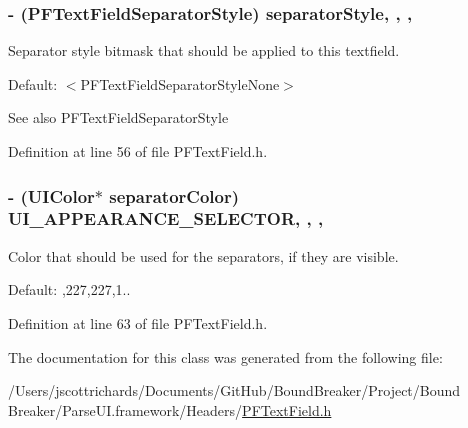 \subsubsection[{separator\+Style}]{\setlength{\rightskip}{0pt plus 5cm}-\/ (P\+F\+Text\+Field\+Separator\+Style) separator\+Style\hspace{0.3cm}{\ttfamily [read]}, {\ttfamily [write]}, {\ttfamily [nonatomic]}, {\ttfamily [assign]}}\label{interface_p_f_text_field_a3ec60a43e08c7bff328c62d7a9038a50}
Separator style bitmask that should be applied to this textfield.

Default\+: $<$\+P\+F\+Text\+Field\+Separator\+Style\+None$>$

\begin{DoxySeeAlso}{See also}
P\+F\+Text\+Field\+Separator\+Style 
\end{DoxySeeAlso}


Definition at line 56 of file P\+F\+Text\+Field.\+h.

\hypertarget{interface_p_f_text_field_a5c0195a8802ca92af06f63762a1093c0}{}
\subsubsection[{U\+I\+\_\+\+A\+P\+P\+E\+A\+R\+A\+N\+C\+E\+\_\+\+S\+E\+L\+E\+C\+T\+O\+R}]{\setlength{\rightskip}{0pt plus 5cm}-\/ (U\+I\+Color$\ast$ separator\+Color) U\+I\+\_\+\+A\+P\+P\+E\+A\+R\+A\+N\+C\+E\+\_\+\+S\+E\+L\+E\+C\+T\+O\+R\hspace{0.3cm}{\ttfamily [read]}, {\ttfamily [write]}, {\ttfamily [nonatomic]}, {\ttfamily [strong]}}\label{interface_p_f_text_field_a5c0195a8802ca92af06f63762a1093c0}
Color that should be used for the separators, if they are visible.

Default\+: {,227,227,1.}. 

Definition at line 63 of file P\+F\+Text\+Field.\+h.



The documentation for this class was generated from the following file\+:\begin{DoxyCompactItemize}
\item 
/\+Users/jscottrichards/\+Documents/\+Git\+Hub/\+Bound\+Breaker/\+Project/\+Bound Breaker/\+Parse\+U\+I.\+framework/\+Headers/\hyperlink{_p_f_text_field_8h}{P\+F\+Text\+Field.\+h}\end{DoxyCompactItemize}
